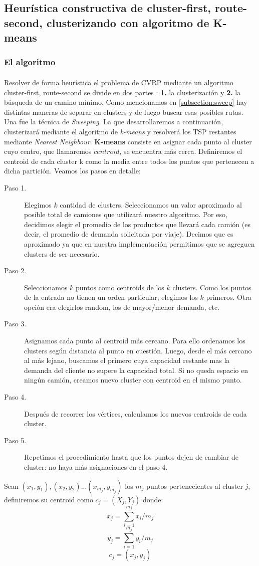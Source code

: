 \subsection{Heurística constructiva de cluster-first, route-second, clusterizando con algoritmo de K-means}
\subsubsection{El algoritmo}\label{kmeans-el-algoritmo}
\paragraph{}
Resolver de forma heurística el problema de CVRP mediante un algoritmo cluster-first, route-second se divide en dos partes : \textbf{1.} la clusterización y \textbf{2.} la búsqueda de un camino mínimo. Como mencionamos en \ref{subsection:sweep} hay distintas maneras de separar en clusters y de luego buscar esas posibles rutas. Una fue la técnica de \textit{Sweeping}. La que desarrollaremos a continuación, clusterizará mediante el algoritmo de \textit{k-means} y resolverá los TSP restantes mediante \textit{Nearest Neighbour}.
\textbf{K-means} consiste en asignar cada punto al cluster cuyo centro, que llamaremos $centroid$, se encuentra más cerca. Definiremos el centroid de cada cluster k como la media entre todos los puntos que pertenecen a dicha partición. Veamos los pasos en detalle:

\begin{description}
	\item[Paso 1.] Elegimos $k$ cantidad de clusters. Seleccionamos un valor aproximado al posible total de camiones que utilizará nuestro algoritmo. Por eso, decidimos elegir el promedio de los productos que llevará cada camión (es decir, el promedio de demanda solicitada por viaje). Decimos que es aproximado ya que en nuestra implementación permitimos que se agreguen clusters de ser necesario.
	\item[Paso 2.] Seleccionamos $k$ puntos como centroids de los $k$ clusters. Como los puntos de la entrada no tienen un orden particular, elegimos los $k$ primeros. Otra opción era elegirlos random, los de mayor/menor demanda, etc.
	\item[Paso 3.] Asignamos cada punto al centroid más cercano. Para ello ordenamos los clusters según distancia al punto en cuestión. Luego, desde el más cercano al más lejano, buscamos el primero cuya capacidad restante mas la demanda del cliente no supere la capacidad total. Si no queda espacio en ningún camión, creamos nuevo cluster con centroid en el mismo punto.
	\item[Paso 4.] Después de recorrer los vértices, calculamos los nuevos centroids de cada cluster.
	\item[Paso 5.] Repetimos el procedimiento hasta que los puntos dejen de cambiar de cluster: no haya más asignaciones en el paso 4.
\end{description}
Sean $(x_{1}, y_{1}), (x_{2}, y_{2})...(x_{m_{j}}, y_{m_{j}})$ los $m_{j}$ puntos pertenecientes al cluster $j$, definiremos su centroid como $c_{j}=(X_{j}, Y_{j})$ donde: \\
$$ x_{j} = \sum_{i=1}^{m_{j}} x_{i}/m_{j}$$
$$ y_{j} = \sum_{i=1}^{m_{j}} y_{i}/m_{j}$$
$$ c_{j}=(x_{j}, y_{j}) $$
